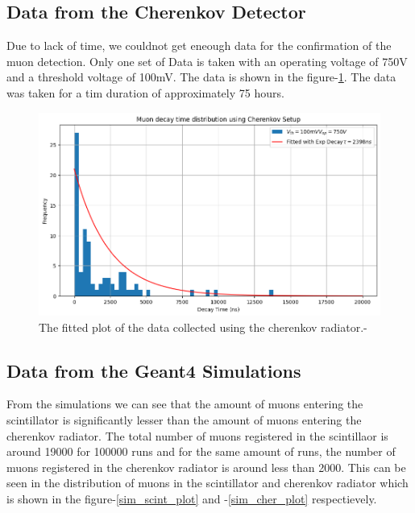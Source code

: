 \documentclass{article}
\begin{document}
\begin{multicols}{2}
\subsection{Data from the Cherenkov Detector}

Due to lack of time, we couldnot get eneough data for the confirmation of the muon detection. Only one set of Data is taken with an operating voltage of 750V and a threshold voltage of 100mV. The data is shown in the figure-\ref{cherenkovplot}. The data was taken for a tim duration of approximately 75 hours. 
\begin{figure}[H]
    \centering
    \includegraphics[width = \columnwidth]{Images/cher_plots.png}
    \caption{The fitted plot of the data collected using the cherenkov radiator.-\cite{python}}
    \label{cherenkovplot}
\end{figure}

\subsection{Data from the Geant4 Simulations}

From the simulations we can see that the amount of muons entering the scintillator is significantly lesser than the amount of muons entering the cherenkov radiator. The total number of muons registered in the scintillaor is around 19000 for 100000 runs and for the same amount of runs, the number of muons registered in the cherenkov radiator is around less than 2000. This can be seen in the distribution of muons in the scintillator and cherenkov radiator which is shown in the figure-\ref{sim_scint_plot} and -\ref{sim_cher_plot} respectievely.


\end{multicols}
\end{document}
